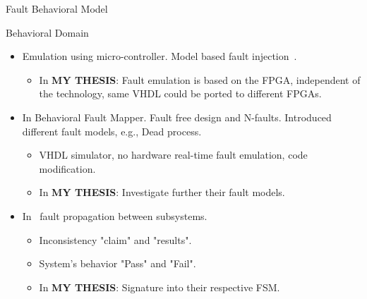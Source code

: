 \documentclass[aspectratio=1610]{beamer}
\begin{document}
\begin{frame}{Fault Behavioral Model}

\begin{block}{Behavioral  Domain}
\end{block}
\begin{itemize}
\item Emulation using micro-controller. Model based fault injection~\citep{Svenningsson2010}.
\begin{itemize}
\item In \textbf{MY THESIS}: Fault emulation is based on the FPGA, independent of the technology, same VHDL could be ported to different FPGAs.

\end{itemize}

\item In \citep{hayne1999behavioral} Behavioral Fault Mapper. Fault free design and N-faults.  Introduced different fault models, e.g., Dead process.

\begin{itemize}
\item VHDL simulator, no hardware real-time fault emulation, code modification.

\item In \textbf{MY THESIS}: Investigate further their fault models.
\end{itemize}

\item In~\citep{chen2017fault} fault propagation between subsystems.

\begin{itemize}

\item Inconsistency "claim" and "results".

\item System's behavior "Pass" and "Fail".

\item In \textbf{MY THESIS}: Signature into their respective FSM.

\end{itemize} 
\end{itemize}







\end{frame}
\end{document}
